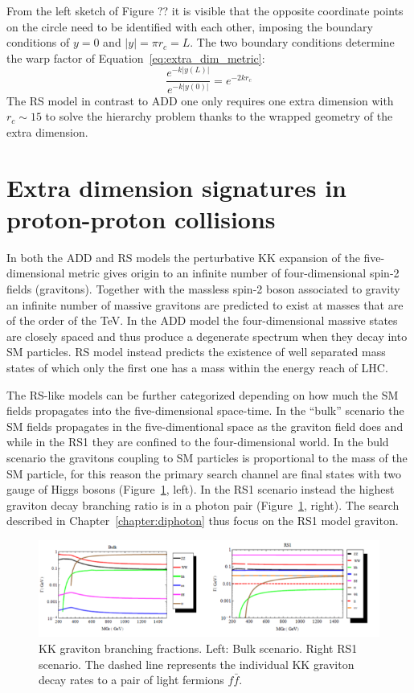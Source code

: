 From the left sketch of Figure ?? it is visible that the opposite coordinate points on the circle need to be
identified with each other, imposing the boundary conditions of $y = 0$ and $|y| = \pi r_c = L$.
The two boundary conditions determine the warp factor of Equation~\ref{eq:extra_dim_metric}:
\[
  \frac{e^{-k|y(L)|}}{e^{-k|y(0)|}} = e^{-2kr_c}
\]
The RS model in contrast to ADD one only requires one extra dimension with $r_c \sim 15$ to solve the
hierarchy problem thanks to the wrapped geometry of the extra dimension.

\section{Extra dimension signatures in proton-proton collisions}
In both the ADD and RS models the perturbative KK expansion of the five-dimensional metric
gives origin to an infinite number of four-dimensional spin-2 fields (gravitons). Together with
the massless spin-2 boson associated to gravity an infinite number of massive gravitons are predicted to exist
at masses that are of the order of the TeV.
In the ADD model the four-dimensional massive states
are closely spaced and thus produce a degenerate spectrum when they decay into SM particles.
RS model instead predicts the existence of well separated mass states of which only the first one has a mass
within the energy reach of LHC.

The RS-like models can be further categorized depending on how much the SM fields propagates into the five-dimensional
space-time. In the ``bulk'' scenario the SM fields propagates in the five-dimentional space as the graviton field does
and while in the RS1 they are confined to the four-dimensional world.
In the buld scenario the gravitons coupling to SM particles is proportional to the mass of the SM particle, for this
reason the primary search channel are final states with two gauge of Higgs bosons (Figure~\ref{fig:rs_coup}, left).
In the RS1 scenario instead the highest graviton decay branching ratio is in a photon pair (Figure~\ref{fig:rs_coup}, right).
The search described in Chapter~\ref{chapter:diphoton} thus focus on the RS1 model graviton.
\begin{figure}[ht!]
  \centering
  \includegraphics[width = 1.\textwidth]{figures/introduction/rs_coup.png}
  \caption{
    KK graviton branching fractions. Left: Bulk scenario. Right RS1 scenario.
    The dashed line represents the individual KK graviton decay rates to a pair of
    light fermions $f\bar{f}$.}
  \label{fig:rs_coup}
\end{figure}

